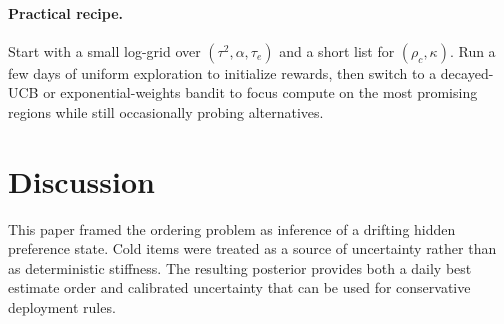 \documentclass[11pt]{article}
\begin{document}
\paragraph{Practical recipe.}
Start with a small log-grid over $(\tau^2,\alpha,\tau_e)$ and a short list for $(\rho_c,\kappa)$.
Run a few days of uniform exploration to initialize rewards, then switch to a decayed-UCB or exponential-weights bandit
to focus compute on the most promising regions while still occasionally probing alternatives.


\section{Discussion}
This paper framed the ordering problem as inference of a drifting hidden preference state.
Cold items were treated as a source of uncertainty rather than as deterministic stiffness.
The resulting posterior provides both a daily best estimate order and calibrated uncertainty that can be used for conservative deployment rules.

\appendix
\end{document}
